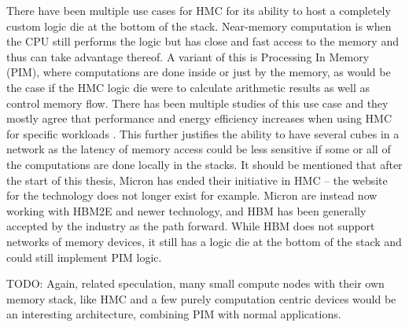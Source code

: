 There have been multiple use cases for HMC for its ability to host a completely custom logic die at the bottom of the stack. Near-memory computation is when the CPU still performs the logic but has close and fast access to the memory and thus can take advantage thereof. A variant of this is Processing In Memory (PIM), where computations are done inside or just by the memory, as would be the case if the HMC logic die were to calculate arithmetic results as well as control memory flow. There has been multiple studies of this use case and they mostly agree that performance and energy efficiency increases when using HMC for specific workloads \cite{7917248} \cite{Min:2019:NEH:3287624.3287642} \cite{7804052} \cite{oliveira2017nim}. This further justifies the ability to have several cubes in a network as the latency of memory access could be less sensitive if some or all of the computations are done locally in the stacks. It should be mentioned that after the start of this thesis, Micron has ended their initiative in HMC -- the website for the technology does not longer exist for example. Micron are instead now working with HBM2E and newer technology, and HBM has been generally accepted by the industry as the path forward. While HBM does not support networks of memory devices, it still has a logic die at the bottom of the stack and could still implement PIM logic.

TODO: Again, related speculation, many small compute nodes with their own memory stack, like HMC and a few purely computation centric devices would be an interesting architecture, combining PIM with normal applications.
